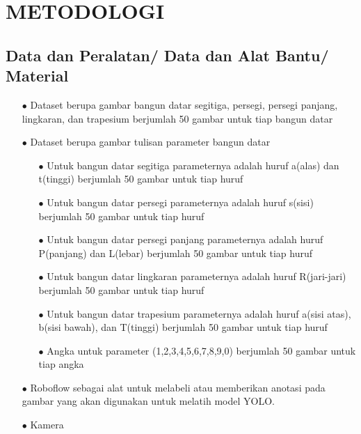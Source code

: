 \chapter{METODOLOGI}
\label{chap:metodologi}


\section{Data dan Peralatan/ Data dan Alat Bantu/ Material }

\begin{itemize}
	\item [$\bullet$]Dataset berupa gambar bangun datar segitiga, persegi, persegi panjang, lingkaran, dan trapesium berjumlah 50 gambar untuk tiap bangun datar
	
	
	\item [$\bullet$]Dataset berupa gambar tulisan parameter bangun datar 
	\begin{itemize}
		\item [$\bullet$]Untuk bangun datar segitiga parameternya adalah huruf a(alas) dan t(tinggi) berjumlah 50 gambar untuk tiap huruf
		\item [$\bullet$]Untuk bangun datar persegi parameternya adalah huruf s(sisi) berjumlah 50 gambar untuk tiap huruf
		\item [$\bullet$]Untuk bangun datar persegi panjang parameternya adalah huruf P(panjang) dan L(lebar) berjumlah 50 gambar untuk tiap huruf
		\item [$\bullet$]Untuk bangun datar lingkaran parameternya adalah huruf R(jari-jari) berjumlah 50 gambar untuk tiap huruf
		\item [$\bullet$]Untuk bangun datar trapesium parameternya adalah huruf a(sisi atas), b(sisi bawah), dan T(tinggi) berjumlah 50 gambar untuk tiap huruf
		\item [$\bullet$]Angka untuk parameter (1,2,3,4,5,6,7,8,9,0) berjumlah 50 gambar untuk tiap angka
	\end{itemize}
	
	\item [$\bullet$]Roboflow sebagai alat untuk melabeli atau memberikan anotasi pada gambar yang akan digunakan untuk melatih model YOLO.
	\item [$\bullet$]Kamera \\
	
\end{itemize}


